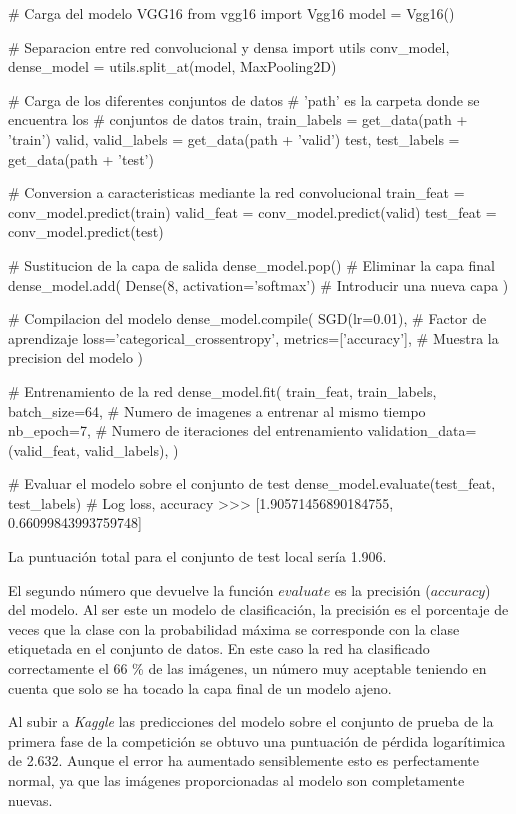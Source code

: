 \begin{python}
# Carga del modelo VGG16
from vgg16 import Vgg16
model = Vgg16()

# Separacion entre red convolucional y densa
import utils
conv_model, dense_model = utils.split_at(model, MaxPooling2D)

# Carga de los diferentes conjuntos de datos
#  'path' es la carpeta donde se encuentra los
#  conjuntos de datos
train, train_labels = get_data(path + 'train')
valid, valid_labels = get_data(path + 'valid')
test, test_labels = get_data(path + 'test')

# Conversion a caracteristicas mediante la red convolucional
train_feat = conv_model.predict(train)
valid_feat = conv_model.predict(valid)
test_feat = conv_model.predict(test)

# Sustitucion de la capa de salida
dense_model.pop()  # Eliminar la capa final
dense_model.add(
    Dense(8, activation='softmax')  # Introducir una nueva capa
)

# Compilacion del modelo
dense_model.compile(
    SGD(lr=0.01),  # Factor de aprendizaje
    loss='categorical_crossentropy',
    metrics=['accuracy'],  # Muestra la precision del modelo
)

# Entrenamiento de la red
dense_model.fit(
    train_feat,
    train_labels,
    batch_size=64,  # Numero de imagenes a entrenar al mismo tiempo
    nb_epoch=7,     # Numero de iteraciones del entrenamiento
    validation_data=(valid_feat, valid_labels),
)

# Evaluar el modelo sobre el conjunto de test
dense_model.evaluate(test_feat, test_labels)
# Log loss, accuracy
>>> [1.90571456890184755, 0.66099843993759748]
\end{python}

La puntuación total para el conjunto de test local sería 1.906. 

El segundo número que devuelve la función $evaluate$ es la precisión
($accuracy$) del modelo. Al ser este un modelo de clasificación, la precisión
es el porcentaje de veces que la clase con la probabilidad máxima se
corresponde con la clase etiquetada en el conjunto de datos. En este caso la
red ha clasificado correctamente el 66 \% de las imágenes, un número muy
aceptable teniendo en cuenta que solo se ha tocado la capa final de un modelo
ajeno.

Al subir a \textit{Kaggle} las predicciones del modelo sobre el conjunto de
prueba de la primera fase de la competición se obtuvo una puntuación de pérdida
logarítimica de 2.632. Aunque el error ha aumentado sensiblemente esto es
perfectamente normal, ya que las imágenes proporcionadas al modelo son
completamente nuevas.

